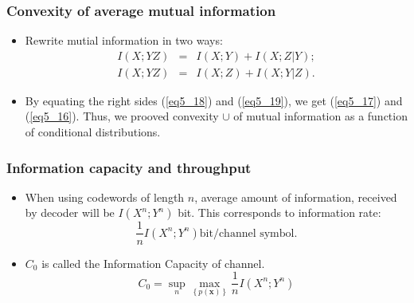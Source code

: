 \documentclass[14pt]{beamer}
\renewcommand{\vec}[1]{\ensuremath{\boldsymbol{#1}}}
\begin{document}
\begin{frame}
\frametitle{Convexity of average mutual information}
\begin{itemize}
    
    \item Rewrite mutial information in two ways:
    \begin{eqnarray}
        \label{eq5_18} I(X;YZ) &=& I(X;Y) + I(X;Z\vert Y);\\
        \label{eq5_19} I(X;YZ) &=& I(X;Z) + I(X;Y\vert Z).
    \end{eqnarray}

    \item By equating the right sides (\ref{eq5_18}) and (\ref{eq5_19}), we get (\ref{eq5_17}) and (\ref{eq5_16}). Thus, we prooved convexity $ \cup $ of mutual information as a function of conditional distributions. \QED
    
    

\end{itemize}
\end{frame}



\begin{frame}
\frametitle{Information capacity and throughput}
\begin{itemize}
    
    \item When using codewords of length $n$, average amount of information, received by decoder will be $I(X^n;Y^n)$ bit. This corresponds to information rate: 
    \[
    \frac{1}{n}I(X^n;Y^n) \mbox{bit/channel symbol}.
    \]

    \item $C_0$ is called the Information Capacity of channel.
    \begin{equation}
        \label{eq5_20}
        C_0 = \mathop {\sup }\limits_n \mathop {\max }%
        \limits_{\left\{ {p(\vec x)} \right\}} \frac{1}{n}I(X^n;Y^n)
    \end{equation}
        
\end{itemize}
\end{frame}

\end{document}
